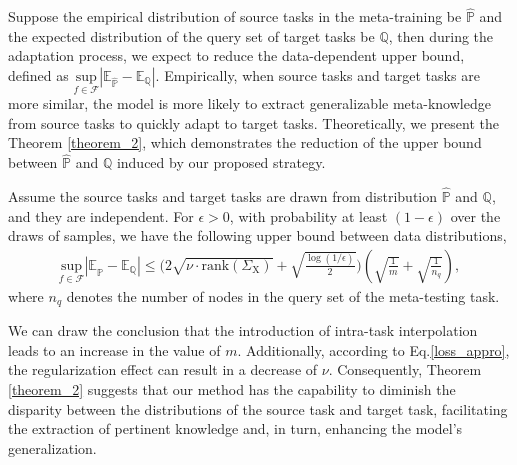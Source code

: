 Suppose the empirical distribution of source tasks in the meta-training be $\mathbb{\hat{P}}$ %
and the expected distribution of the query set of target tasks be $\mathbb Q$, then during the adaptation process, we expect to reduce the data-dependent upper bound, defined as $\underset{f\in\mathcal{F}}{\text{sup}}|\mathbb E_{\hat{\mathbb P}} \!-\! \mathbb E_{\mathbb Q}|$.
Empirically, when source tasks and target tasks are more similar, the model is more likely to extract generalizable meta-knowledge from source tasks to quickly adapt to target tasks. Theoretically, we present the Theorem \ref{theorem_2}, which demonstrates the reduction of the upper bound between $\mathbb{\hat{P}}$ and $\mathbb{Q}$ induced by our proposed strategy. %
\begin{theorem}
\label{theorem_2}
Assume the source tasks and target tasks are drawn from distribution $\mathbb{\hat{P}}$ and $\mathbb{Q}$, and they are independent. For $\epsilon\!>\!0$, with probability at least $(1\!-\!\epsilon)$ over the draws of samples, we have the following upper bound between data distributions,
    \begin{equation}
    \begin{split}
      \underset{f\in\mathcal{F}}{\mathrm{sup}}|\mathbb{E}_{\hat{\mathbb P} }\!-\!\mathbb E_{\mathbb Q}| \leq \Bigg(2\sqrt{\nu\cdot\text{rank}(\Sigma_{\mathrm{X}})} + \sqrt{\frac{\log(1/\epsilon)}{2}} \Bigg) \left( \sqrt{\frac{1}{m}} \!+\! \sqrt{\frac{1}{n_q}} \right),  
    \end{split}
    \end{equation}
    where $n_q$ denotes the number of nodes in the query set of the meta-testing task.
\end{theorem}
We can draw the conclusion that the introduction of intra-task interpolation leads to an increase in the value of $m$. Additionally, according to Eq.\ref{loss_appro}, the regularization effect can result in a decrease of $\nu$. Consequently, Theorem \ref{theorem_2} suggests that our method has the capability to diminish the disparity between the distributions of the source task and target task, facilitating the extraction of pertinent knowledge and, in turn, enhancing the model's generalization. %